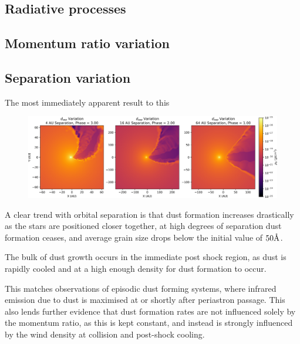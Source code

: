 \subsection{Radiative processes}

\subsection{Momentum ratio variation}

\subsection{Separation variation}


The most immediately apparent result to this 


\begin{figure}
  \includegraphics[width=\textwidth]{assets/adiabatic-flow/adiabatic-flow-a4.png}
\end{figure}


A clear trend with orbital separation is that dust formation increases drastically as the stars are positioned closer together, at high degrees of separation dust formation ceases, and average grain size drops below the initial value of $50 \text \AA$.

The bulk of dust growth occurs in the immediate post shock region, as dust is rapidly cooled and at a high enough density for dust formation to occur.

This matches observations of episodic dust forming systems, where infrared emission due to dust is maximised at or shortly after periastron passage. This also lends further evidence that dust formation rates are not influenced solely by the momentum ratio, as this is kept constant, and instead is strongly influenced by the wind density at collision and post-shock cooling. 

